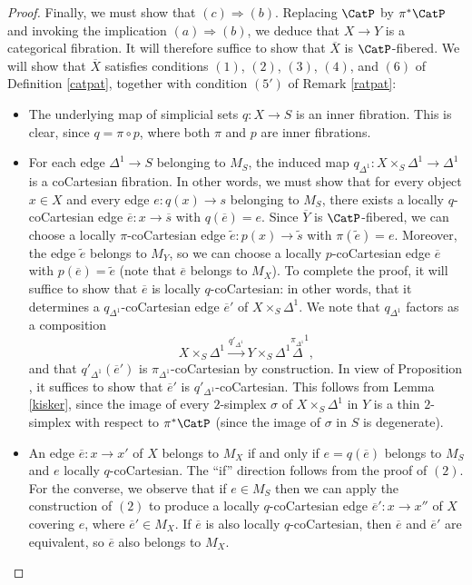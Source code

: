 \begin{proof}
Finally, we must show that $(c) \Rightarrow (b)$. Replacing $\CatP$ by $\pi^{\ast} \CatP$ and
invoking the implication $(a) \Rightarrow (b)$, we deduce that $X \rightarrow Y$ is a categorical fibration. It will therefore suffice to show that $\overline{X}$ is $\CatP$-fibered.
We will show that $\overline{X}$ satisfies conditions $(1)$, $(2)$, $(3)$, $(4)$, and
$(6)$ of Definition \ref{catpat}, together with condition $(5')$ of Remark \ref{ratpat}:
\begin{itemize}
\item[$(1)$] The underlying map of simplicial sets $q: X \rightarrow S$ is an inner fibration.
This is clear, since $q = \pi \circ p$, where both $\pi$ and $p$ are inner fibrations.

\item[$(2)$] For each edge $\Delta^1 \rightarrow S$ belonging to $M_S$, the induced map
$q_{\Delta^1}: X \times_{S} \Delta^1 \rightarrow \Delta^1$ is a coCartesian fibration.
In other words, we must show that for every object $x \in X$ and every edge
$e: q(x) \rightarrow s$ belonging to $M_{S}$, there exists a locally
$q$-coCartesian edge $\overline{e}: x \rightarrow \overline{s}$ with
$q( \overline{e}) = e$. Since $\overline{Y}$ is $\CatP$-fibered, we can choose
a locally $\pi$-coCartesian edge $\widetilde{e}: p(x) \rightarrow \widetilde{s}$
with $\pi( \widetilde{e} ) = e$. Moreover, the edge $\widetilde{e}$ belongs to
$M_{Y}$, so we can choose a locally $p$-coCartesian edge $\overline{e}$ with
$p( \overline{e} ) = \widetilde{e}$ (note that $\overline{e}$ belongs to $M_{X}$).
To complete the proof, it will suffice to show that $\overline{e}$ is locally
$q$-coCartesian: in other words, that it determines a $q_{\Delta^1}$-coCartesian edge
$\overline{e}'$ of $X \times_{S} \Delta^1$. We note that $q_{ \Delta^1}$ factors as a composition
$$ X \times_{S} \Delta^1 \stackrel{ q'_{ \Delta^1} }{\rightarrow} Y \times_{S} \Delta^1
\stackrel{ \pi_{\Delta^1}} \Delta^1,$$
and that $q'_{ \Delta^1}( \overline{e}')$ is $\pi_{ \Delta^1}$-coCartesian by construction.
In view of Proposition , it suffices to show that 
$\overline{e}'$ is $q'_{ \Delta^1}$-coCartesian. This follows from Lemma \ref{kisker}, since
the image of every $2$-simplex $\sigma$ of $X \times_{S} \Delta^1$ in $Y$ is a thin
$2$-simplex with respect to $\pi^{\ast} \CatP$ (since the image of $\sigma$ in $S$ is degenerate).

\item[$(3)$] An edge $\overline{e}: x \rightarrow x'$ of $X$ belongs to $M_X$ if and only if $e = q(\overline{e})$ belongs to $M_S$ and $e$ locally $q$-coCartesian. The ``if'' direction follows from the proof of $(2)$. For the converse, we observe that if $e \in M_{S}$ then we can apply the construction of $(2)$ to
produce a locally $q$-coCartesian edge $\overline{e}': x \rightarrow x''$ of $X$ covering
$e$, where $\overline{e}' \in M_{X}$. If $\overline{e}$ is also locally $q$-coCartesian, then
$\overline{e}$ and $\overline{e}'$ are equivalent, so $\overline{e}$ also belongs to $M_{X}$.


\end{itemize}
\end{proof}
